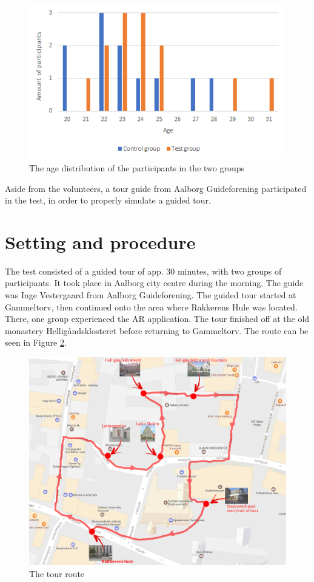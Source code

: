 \begin{figure}[h!]
  \centering
  \includegraphics[scale=0.8]{figures/agedistribution.png}
  \caption{The age distribution of the participants in the two groups}\label{fig:age}
\end{figure}

Aside from the volunteers, a tour guide from Aalborg Guideforening participated in the test, in order to properly simulate a guided tour.

\section{Setting and procedure}
The test consisted of a guided tour of app. 30 minutes, with two groups of participants. It took place in Aalborg city centre during the morning. The guide was Inge Vestergaard from Aalborg Guideforening. The guided tour started at Gammeltorv, then continued onto the area where Rakkerens Hule was located. There, one group experienced the AR application. The tour finished off at the old monastery Helligåndsklosteret before returning to Gammeltorv. The route can be seen in Figure \ref{fig:map}. 

\begin{figure}[h!]
   \centering
   \includegraphics[width=\textwidth]{figures/Tour_map.png}
   \caption{The tour route}\label{fig:map}
\end{figure}

